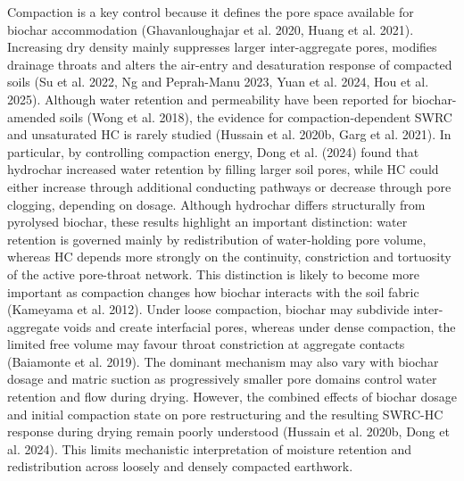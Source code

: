 Compaction is a key control because it defines the pore space available for biochar accommodation (Ghavanloughajar et al. 2020, Huang et al. 2021). Increasing dry density mainly suppresses larger inter-aggregate pores, modifies drainage throats and alters the air-entry and desaturation response of compacted soils (Su et al. 2022, Ng and Peprah-Manu 2023, Yuan et al. 2024, Hou et al. 2025). Although water retention and permeability have been reported for biochar-amended soils (Wong et al. 2018), the evidence for compaction-dependent SWRC and unsaturated HC is rarely studied (Hussain et al. 2020b, Garg et al. 2021). In particular, by controlling compaction energy, Dong et al. (2024) found that hydrochar increased water retention by filling larger soil pores, while HC could either increase through additional conducting pathways or decrease through pore clogging, depending on dosage. Although hydrochar differs structurally from pyrolysed biochar, these results highlight an important distinction: water retention is governed mainly by redistribution of water-holding pore volume, whereas HC depends more strongly on the continuity, constriction and tortuosity of the active pore-throat network. This distinction is likely to become more important as compaction changes how biochar interacts with the soil fabric (Kameyama et al. 2012). Under loose compaction, biochar may subdivide inter-aggregate voids and create interfacial pores, whereas under dense compaction, the limited free volume may favour throat constriction at aggregate contacts (Baiamonte et al. 2019). The dominant mechanism may also vary with biochar dosage and matric suction as progressively smaller pore domains control water retention and flow during drying. However, the combined effects of biochar dosage and initial compaction state on pore restructuring and the resulting SWRC-HC response during drying remain poorly understood (Hussain et al. 2020b, Dong et al. 2024). This limits mechanistic interpretation of moisture retention and redistribution across loosely and densely compacted earthwork.

